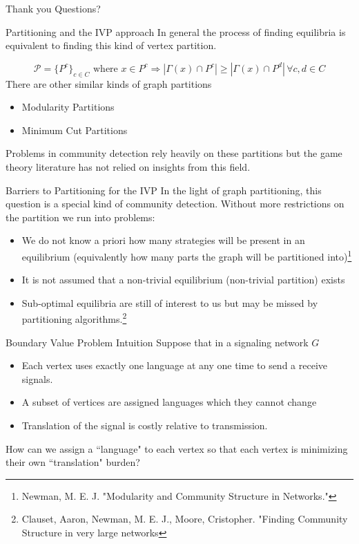 \documentclass{beamer}
\begin{document}
\begin{frame}{Thank you}
	\centering
	\Large Questions?
\end{frame}

\begin{frame}{Partitioning and the IVP approach}
	In general the process of finding equilibria is equivalent to finding this kind of vertex partition.
	
	\begin{equation}
		\mathcal{P}= \{P^{c}\}_{c\in C} \text{ where } x\in P^{c}\Rightarrow |\Gamma(x)\cap P^{c}|\geq |\Gamma(x)\cap P^{d}|\, \forall c,d \in C 
	\end{equation}
	There are other similar kinds of graph partitions
	\begin{itemize}
		\item Modularity Partitions
		\item Minimum Cut Partitions
	\end{itemize}
	Problems in community detection rely heavily on these partitions but the game theory literature has not relied on insights from this field. 
\end{frame}

\begin{frame}{Barriers to Partitioning for the IVP}
	In the light of graph partitioning, this question is a special kind of community detection. Without more restrictions on the partition we run into problems: 
	\begin{itemize}
		\item We do not know a priori how many strategies will be present in an equilibrium (equivalently how many parts the graph will be partitioned into)\footnote{Newman, M. E. J. "Modularity and Community Structure in Networks."}
		\item It is not assumed that a non-trivial equilibrium (non-trivial partition) exists
		\item Sub-optimal equilibria are still of interest to us but may be missed by partitioning algorithms.\footnote{Clauset, Aaron, Newman, M. E. J., Moore, Cristopher. "Finding Community Structure in very large networks}  
	\end{itemize}
\end{frame}

\begin{frame}{Boundary Value Problem Intuition}
	Suppose that in  a signaling network $G$
	\begin{itemize}
		\item Each vertex uses exactly one language at any one time to send a receive signals. 
		\item A subset of vertices are assigned languages which they cannot change
		\item Translation of the signal is costly relative to transmission. 
	\end{itemize}
	
	How can we assign a ``language" to each vertex so that each vertex is minimizing their own ``translation" burden?
\end{frame}
\end{document}
